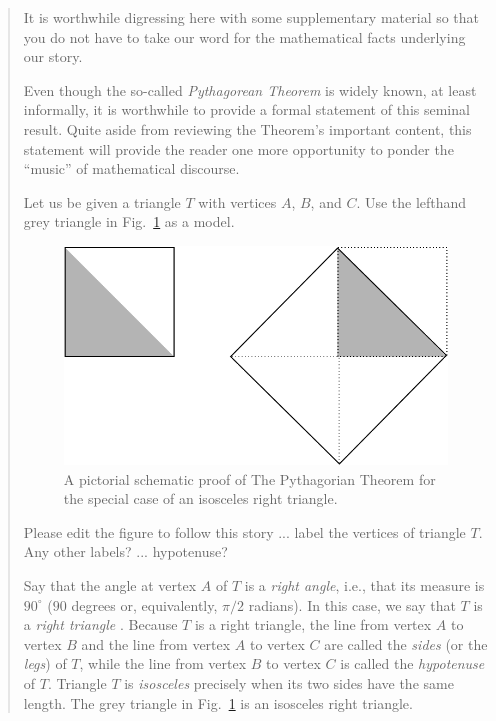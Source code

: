 \begin{quote}
It is worthwhile digressing here with some supplementary material so
that you do not have to take our word for the mathematical facts
underlying our story.

Even though the so-called {\it Pythagorean Theorem} is widely known,
at least informally, it is worthwhile to provide a formal statement of
this seminal result.  Quite aside from reviewing the Theorem's
important content, this statement will provide the reader one more
opportunity to ponder the ``music'' of mathematical discourse.

Let us be given a triangle $T$ with vertices $A$, $B$, and $C$.  Use
the lefthand grey triangle in Fig.~\ref{fig:unitsquare} as a model.
\begin{figure}[htb]
\begin{center}
       \includegraphics[scale=0.35]{FiguresArithmetic/UnitSquareSQRT2}
\caption{A pictorial schematic proof of The Pythagorian Theorem for
  the special case of an isosceles right triangle.
\label{fig:unitsquare}}
\end{center}
\end{figure}

{\Arny Please edit the figure to follow this story ... label the
  vertices of triangle $T$.  Any other labels? ... hypotenuse?  }

Say that the angle at vertex $A$ of $T$ is a {\em right angle},
 i.e., that its measure is $90^\circ$ ($90$ degrees
or, equivalently, $\pi/2$ radians).  In this case, we say that $T$ is
a {\em right triangle} .  Because $T$ is a right
triangle, the line from vertex $A$ to vertex $B$ and the line from
vertex $A$ to vertex $C$ are called the {\em sides}  (or the {\it legs}) of $T$, while the line from
vertex $B$ to vertex $C$ is called the {\em hypotenuse}
 of $T$.  Triangle $T$ is {\em
  isosceles}  precisely when its two sides
have the same length.  The grey triangle in Fig.~\ref{fig:unitsquare}
is an isosceles right triangle.


\end{quote}
